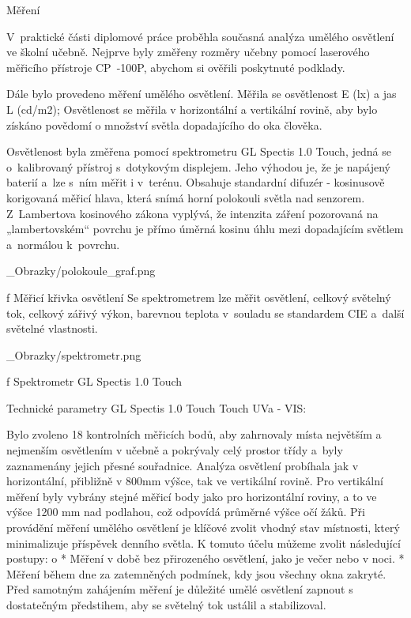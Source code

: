 \chap Měření

V~praktické části diplomové práce proběhla současná analýza umělého osvětlení ve školní učebně.
Nejprve byly změřeny rozměry učebny pomocí laserového měřicího přístroje {\sbf CP~-100P},
abychom si ověřili poskytnuté podklady.

Dále bylo provedeno měření umělého osvětlení. Měřila se osvětlenost E (lx) a jas L (cd/m2);
Osvětlenost se měřila v horizontální a vertikální rovině, aby bylo získáno povědomí o množství světla dopadajícího do oka člověka.

Osvětlenost byla změřena pomocí spektrometru {\sbf GL Spectis 1.0 Touch}, jedná se o~kalibrovaný přístroj
s~dotykovým displejem. Jeho výhodou je, že je napájený baterií a~lze s~ním měřit i v~terénu. Obsahuje standardní
difuzér - kosinusově korigovaná měřicí hlava, která snímá horní polokouli světla nad senzorem. Z~Lambertova
kosinového zákona vyplývá, že intenzita záření pozorovaná na „lambertovském“ povrchu je přímo úměrná kosinu
úhlu mezi dopadajícím světlem a~normálou k~povrchu.

\medskip {}
\picw=8cm _Obrazky/polokoule_graf.png
\caption/f Měřicí křivka osvětlení
\medskip
Se spektrometrem lze měřit osvětlení, celkový světelný tok, celkový zářivý výkon, barevnou teplota v~souladu
se standardem CIE a~další světelné vlastnosti.

\medskip {}
\picw=5cm _Obrazky/spektrometr.png
\caption/f Spektrometr GL Spectis 1.0 Touch
\medskip

\medskip
{\sbf Technické parametry GL Spectis 1.0 Touch Touch UVa - VIS:} 
\medskip
{}

Bylo zvoleno 18 kontrolních měřicích bodů, aby zahrnovaly místa  největším a nejmenším osvětlením v učebně a pokrývaly celý prostor třídy
a~byly zaznamenány jejich přesné souřadnice. Analýza osvětlení probíhala jak v horizontální,
přibližně v 800mm výšce, tak ve vertikální rovině. Pro vertikální měření byly vybrány stejné měřicí body jako pro horizontální roviny,
a to ve výšce 1200 mm nad podlahou, což odpovídá průměrné výšce očí žáků.
\medskip
Při provádění měření umělého osvětlení je klíčové zvolit vhodný stav místnosti,
který minimalizuje příspěvek denního světla. K tomuto účelu můžeme zvolit následující postupy:
\medskip
\begitems \style o
    * Měření v době bez přirozeného osvětlení, jako je večer nebo v noci.
    * Měření během dne za zatemněných podmínek, kdy jsou všechny okna zakryté.
\enditems
\medskip
Před samotným zahájením měření je důležité umělé osvětlení zapnout s dostatečným předstihem, aby se světelný tok ustálil a stabilizoval.

